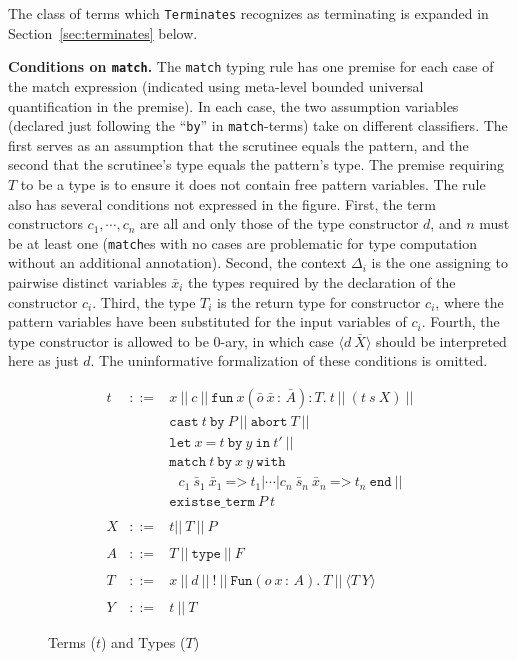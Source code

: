 \documentclass[preprint,natbib]{sigplanconf}
\newcommand{\Eq}[0]{\texttt{=}}
\newcommand{\bang}[0]{\texttt{!}}
\begin{document}
\noindent The class of terms which \texttt{Terminates} recognizes as
terminating is expanded in Section~\ref{sec:terminates} below.

\textbf{Conditions on \texttt{match}.} The \texttt{match} typing rule
has one premise for each case of the match expression (indicated using
meta-level bounded universal quantification in the premise).  In each
case, the two assumption variables (declared just following the
``\texttt{by}'' in \texttt{match}-terms) take on different
classifiers.  The first serves as an assumption that the scrutinee
equals the pattern, and the second that the scrutinee's type equals
the pattern's type.  The premise requiring $T$ to be a type is to
ensure it does not contain free pattern variables.  The rule also has
several conditions not expressed in the figure.  First, the term
constructors $c_1, \cdots, c_n$ are all and only those of the type
constructor $d$, and $n$ must be at least one (\texttt{match}es with
no cases are problematic for type computation without an additional
annotation).  Second, the context $\Delta_i$ is the one assigning to
pairwise distinct variables $\bar{x}_i$ the types required by the
declaration of the constructor $c_i$.  Third, the type $T_i$ is the
return type for constructor $c_i$, where the pattern variables have
been substituted for the input variables of $c_i$.  Fourth, the type
constructor is allowed to be $0$-ary, in which case $\langle d\
\bar{X}\rangle$ should be interpreted here as just $d$.  The
uninformative formalization of these conditions is omitted.

\begin{figure}
\begin{eqnarray*}
t & ::= & x\ ||\ c\ ||\ 
       \texttt{fun}\ x(\bar{o}\ \bar{x}\,:\,\bar{A}) : T .\ t\ ||\ (t\ s\ X)\ ||
\\ 
\ &\ &        \texttt{cast}\ t\ \texttt{by}\ P  \ ||\ \texttt{abort}\ T\ ||\\ 
\ & \ & \texttt{let}\ x\ \Eq\ t\ \texttt{by}\ y\ \texttt{in}\ t' \ ||\ 
\\ 
\ & \ & \texttt{match}\ t\ \texttt{by}\ x\ y \ \texttt{with}\\
\ & \ & \ \ \ c_1\ \bar{s}_1\ \bar{x}_1\ \texttt{=>}\ t_1 |
 \cdots | c_n\ \bar{s}_n\ \bar{x}_n\ \texttt{=>}\ t_n\ \texttt{end}\ ||\\
\ & \ & \texttt{existse\_term}\ P\ t
\\
\\
X & ::= & t ||\ T\ ||\ P
\\
\\
A & ::= & T\ ||\ \texttt{type}\ ||\ F 
\\
\\
T & ::= & x\ ||\ d\ ||\ \bang\ ||\ 
     \texttt{Fun}(o\ x\,:\,A) . \ T\ ||\ \langle T\ Y\rangle 
\\
\\
Y & ::= & t\ ||\ T
\end{eqnarray*}
\caption{\label{fig:terms} Terms ($t$) and Types ($T$)}
\end{figure}
\end{document}
